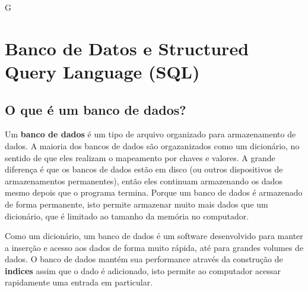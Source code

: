 G%

\chapter{Banco de Datos e Structured Query Language (SQL)}

\section{O que é um banco de dados?}


Um {\bf banco de dados} é um tipo de arquivo organizado para armazenamento de
dados. A maioria dos bancos de dados são orgazanizados como um dicionário, no
sentido de que eles realizam o mapeamento por chaves e valores. A grande
diferença é que os bancos de dados estão em disco (ou outros dispositivos de
armazenamentos permanentes), então eles continuam armazenando os dados mesmo
depois que o programa termina. Porque um banco de dados é armazenado de forma
permanente, isto permite armazenar muito mais dados que um dicionário, que é
limitado ao tamanho da memória no computador.


Como um dicionário, um banco de dados é um software desenvolvido para manter a
inserção e acesso aos dados de forma muito rápida, até para grandes volumes de
dados. O banco de dados mantém sua performance através da construção de
{\bf indices} assim que o dado é adicionado, isto permite ao computador acessar
rapidamente uma entrada em particular.

